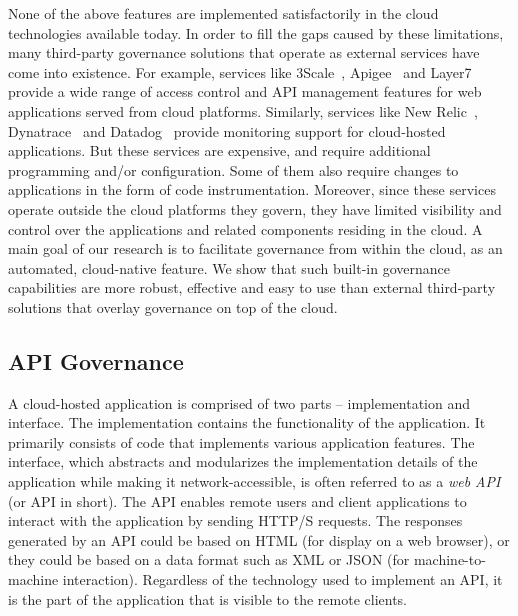 None of the above features are implemented satisfactorily in the
cloud technologies available today.
In order to fill the gaps caused by these limitations, many third-party governance solutions that operate as external services
have come into existence. For example, services like 3Scale~\cite{3scale}, Apigee~\cite{apigee} and Layer7~\cite{layer7} provide a wide range
of access control and API management features for web applications served from cloud platforms. Similarly, 
services like New Relic~\cite{newrelic}, Dynatrace~\cite{dynatrace} and Datadog~\cite{datadog} provide monitoring support for cloud-hosted 
applications. But these services are expensive, and require additional programming and/or configuration.
Some of them also require changes to applications in the form of code instrumentation. Moreover,
since these services operate outside the cloud platforms they govern, they have limited visibility and control
over the applications and related components residing in the cloud. A main goal of our research is to facilitate governance
from within the cloud, as an automated, cloud-native feature. We show that such built-in governance capabilities are
more robust, effective and easy to use than external third-party solutions that overlay governance on top of the
cloud.

\subsection{API Governance}
A cloud-hosted application is comprised of two parts -- implementation and interface. The implementation
contains the functionality of the application. It primarily consists of code that implements
various application features. 
The interface, which abstracts and modularizes the implementation details of the application while making
it network-accessible, is often referred to as a \textit{web API} (or API in short). 
The API enables remote users and client applications to interact with the application by sending
HTTP/S requests. The responses generated by an API could be based on HTML (for display on a web
browser), or they could be based on a data format such as XML or JSON (for machine-to-machine 
interaction). Regardless of the technology used to implement an API, it is the part of the application 
that is visible to the remote clients. 

